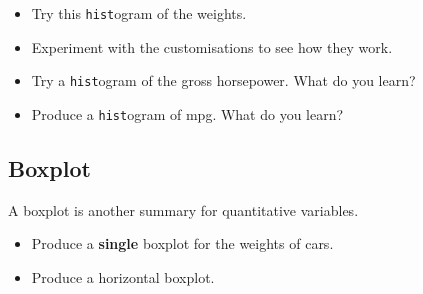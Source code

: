 \documentclass[]{article}
\newenvironment{Shaded}{\begin{snugshade}}{\end{snugshade}}
\newcommand{\DataTypeTok}[1]{\textcolor[rgb]{0.13,0.29,0.53}{#1}}
\newcommand{\DecValTok}[1]{\textcolor[rgb]{0.00,0.00,0.81}{#1}}
\newcommand{\FloatTok}[1]{\textcolor[rgb]{0.00,0.00,0.81}{#1}}
\newcommand{\KeywordTok}[1]{\textcolor[rgb]{0.13,0.29,0.53}{\textbf{#1}}}
\newcommand{\NormalTok}[1]{#1}
\newcommand{\OperatorTok}[1]{\textcolor[rgb]{0.81,0.36,0.00}{\textbf{#1}}}
\newcommand{\StringTok}[1]{\textcolor[rgb]{0.31,0.60,0.02}{#1}}
\providecommand{\tightlist}{%
  \setlength{\itemsep}{0pt}\setlength{\parskip}{0pt}}
\begin{document}
\begin{itemize}
\tightlist
\item
  Try this \texttt{hist}ogram of the weights.
\end{itemize}

\begin{Shaded}
\end{Shaded}

\begin{itemize}
\item
  Experiment with the customisations to see how they work.
\item
  Try a \texttt{hist}ogram of the gross horsepower. What do you learn?
\item
  Produce a \texttt{hist}ogram of mpg. What do you learn?
\end{itemize}

\hypertarget{boxplot}{%
\subsection{Boxplot}\label{boxplot}}

A boxplot is another summary for quantitative variables.

\begin{itemize}
\tightlist
\item
  Produce a \textbf{single} boxplot for the weights of cars.
\end{itemize}

\begin{Shaded}
\end{Shaded}

\begin{itemize}
\tightlist
\item
  Produce a horizontal boxplot.
\end{itemize}
\end{document}
